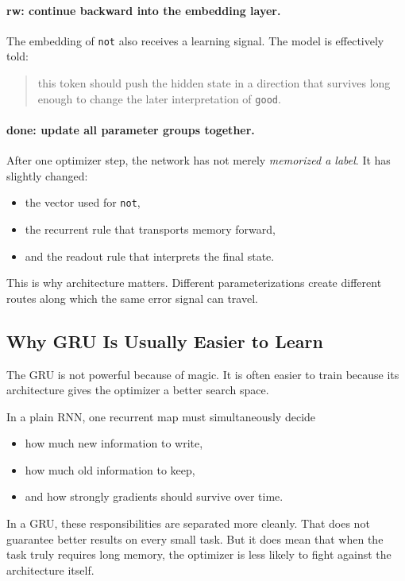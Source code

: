 \documentclass[12pt,a4paper]{article}
\begin{document}
\paragraph{rw: continue backward into the embedding layer.}
The embedding of \texttt{not} also receives a learning signal. The model is effectively told:
\begin{quote}
this token should push the hidden state in a direction that survives long enough to change the later interpretation of \texttt{good}.
\end{quote}

\paragraph{done: update all parameter groups together.}
After one optimizer step, the network has not merely \emph{memorized a label}. It has slightly changed:
\begin{itemize}
  \item the vector used for \texttt{not},
  \item the recurrent rule that transports memory forward,
  \item and the readout rule that interprets the final state.
\end{itemize}

This is why architecture matters. Different parameterizations create different routes along which the same error signal can travel.

\subsection{Why GRU Is Usually Easier to Learn}

The GRU is not powerful because of magic. It is often easier to train because its architecture gives the optimizer a better search space.

In a plain RNN, one recurrent map must simultaneously decide
\begin{itemize}
  \item how much new information to write,
  \item how much old information to keep,
  \item and how strongly gradients should survive over time.
\end{itemize}

In a GRU, these responsibilities are separated more cleanly. That does not guarantee better results on every small task. But it does mean that when the task truly requires long memory, the optimizer is less likely to fight against the architecture itself.
\end{document}
